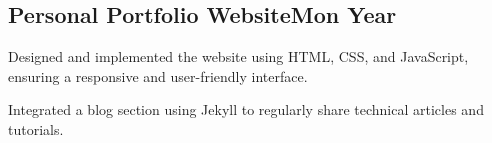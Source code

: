 \documentclass[a4paper, 12pt]{article}
\begin{document}
\subsection{{Personal Portfolio Website}\hfill Mon Year}
\begin{zitemize}
\vspace*{-5pt}
\item Designed and implemented the website using HTML, CSS, and JavaScript, ensuring a responsive and user-friendly interface.
\item Integrated a blog section using Jekyll to regularly share technical articles and tutorials.
\end{zitemize}
\end{document}
